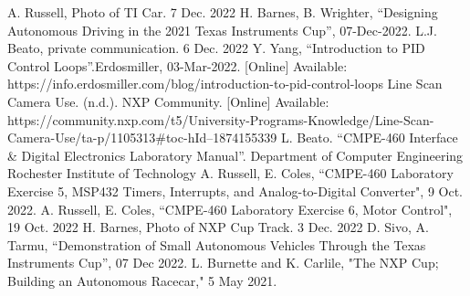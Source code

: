 \documentclass{article}
\begin{document}
\begin{thebibliography}{1}

 A. Russell, Photo of TI Car. 7 Dec. 2022
 H. Barnes, B. Wrighter, “Designing Autonomous Driving in the 2021 Texas Instruments Cup”, 07-Dec-2022.
 L.J. Beato, private communication. 6  Dec. 2022
 Y. Yang, “Introduction to PID Control Loops”.Erdosmiller, 03-Mar-2022. [Online] Available: https://info.erdosmiller.com/blog/introduction-to-pid-control-loops
 Line Scan Camera Use. (n.d.). NXP Community. [Online] Available: https://community.nxp.com/t5/University-Programs-Knowledge/Line-Scan-Camera-Use/ta-p/1105313\#toc-hId--1874155339 
 L. Beato. “CMPE-460 Interface \& Digital Electronics Laboratory Manual”. Department of Computer Engineering Rochester Institute of Technology
 A. Russell, E. Coles, “CMPE-460 Laboratory Exercise 5, MSP432 Timers, Interrupts, and Analog-to-Digital Converter", 9 Oct. 2022.
 A. Russell, E. Coles, “CMPE-460 Laboratory Exercise 6, Motor Control", 19 Oct. 2022
 H. Barnes, Photo of NXP Cup Track. 3 Dec. 2022
 D. Sivo, A. Tarmu, “Demonstration of Small Autonomous Vehicles Through the Texas Instruments Cup”, 07 Dec 2022.
 L. Burnette and K. Carlile, "The NXP Cup; Building an Autonomous Racecar," 5 May 2021.

\end{thebibliography}


\end{document}
